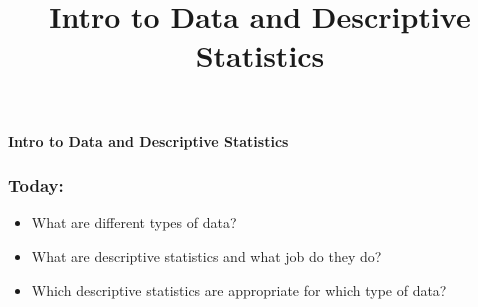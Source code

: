 \documentclass[aspectratio=169]{beamer}
\title{Intro to Data and Descriptive Statistics}
\date{}
\theoremstyle{principle}
\begin{document}


{
  \begin{frame}[plain]
  
\begin{mdframed}[tikzsetting={draw=white,fill=white,fill opacity=0.6,draw opacity=0.4,
               line width=0pt},backgroundcolor=none,leftmargin=20,
               rightmargin=20,innertopmargin=4pt]
\begin{center}
\Huge \textbf{Intro to Data and Descriptive Statistics}
\end{center}
\end{mdframed}

  \end{frame}
}

\begin{frame}
\frametitle{Today:}

\begin{itemize}
\item What are different types of data?
\bigskip
\bigskip
\item What are descriptive statistics and what job do they do?
\bigskip
\bigskip
\item Which descriptive statistics are appropriate for which type of data?
\end{itemize}

\end{frame}
\end{document}
